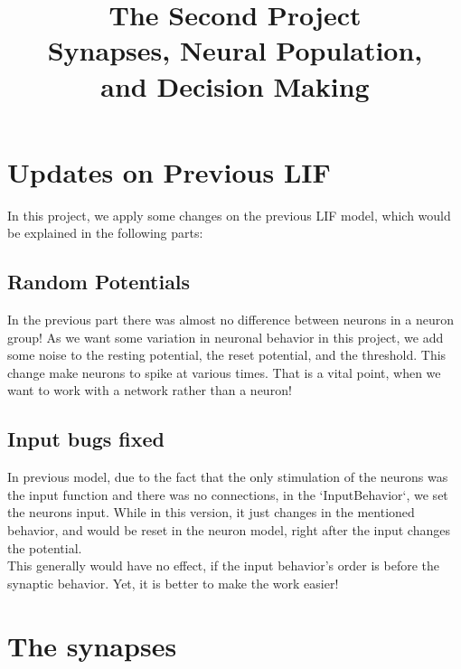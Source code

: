 \documentclass{article}
\title{The Second Project\\\large Synapses, Neural Population,\\and Decision Making}
\begin{document}
	\maketitle
	\section{Updates on Previous LIF}
	In this project, we apply some changes on the previous LIF model, which would be explained in the following parts:
	\subsection{Random Potentials}
	In the previous part there was almost no difference between neurons in a neuron group! As we want some variation in neuronal behavior in this project, we add some noise to the resting potential, the reset potential, and the threshold. This change make neurons to spike at various times. That is a vital point, when we want to work with a network rather than a neuron!
	
	\subsection{Input bugs fixed}
	In previous model, due to the fact that the only stimulation of the neurons was the input function and there was no connections, in the `InputBehavior`, we set the neurons input. While in this version, it just changes in the mentioned behavior, and would be reset in the neuron model, right after the input changes the potential.\\
	
	This generally would have no effect, if the input behavior's order is before the synaptic behavior. Yet, it is better to make the work easier!
	\section{The synapses}
\end{document}
